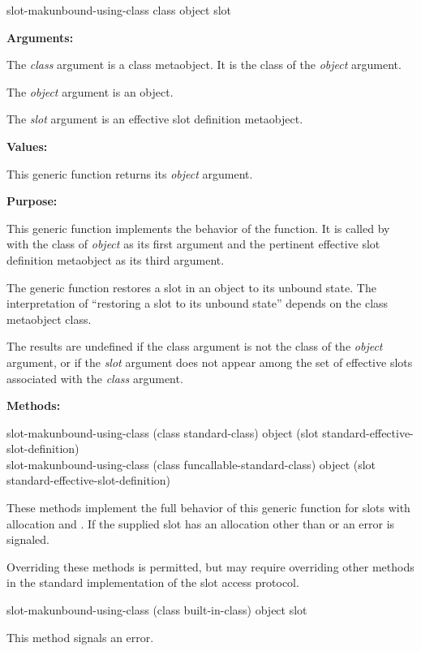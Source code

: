 \begin{defun}
slot-makunbound-using-class class object slot

\textbf{Arguments:}

The \emph{class} argument is a class metaobject. It is the class of the \emph{object} argument.

The \emph{object} argument is an object.

The \emph{slot} argument is an effective slot definition metaobject.

\textbf{Values:}

This generic function returns its \emph{object} argument.

\textbf{Purpose:}

This generic function implements the behavior of the 
function. It is called by  with the class of \emph{object}
as its first argument and the pertinent effective slot definition metaobject as
its third argument.

The generic function  restores a slot in an
object to its unbound state. The interpretation of ``restoring a slot to its
unbound state'' depends on the class metaobject class.

The results are undefined if the class argument is not the class of the
\emph{object} argument, or if the \emph{slot} argument does not appear among the
set of effective slots associated with the \emph{class} argument.

\textbf{Methods:}

\begin{defun}
slot-makunbound-using-class (class standard-class) object (slot
  standard-effective-slot-definition) \\
slot-makunbound-using-class (class funcallable-standard-class) object (slot
  standard-effective-slot-definition)

  These methods implement the full behavior of this generic function for slots
  with allocation  and . If the supplied slot has an
  allocation other than  or  an error is signaled.

Overriding these methods is permitted, but may require overriding other methods
in the standard implementation of the slot access protocol.
\end{defun}

\begin{defun}
slot-makunbound-using-class (class built-in-class) object slot

This method signals an error.
\end{defun}
\end{defun}

